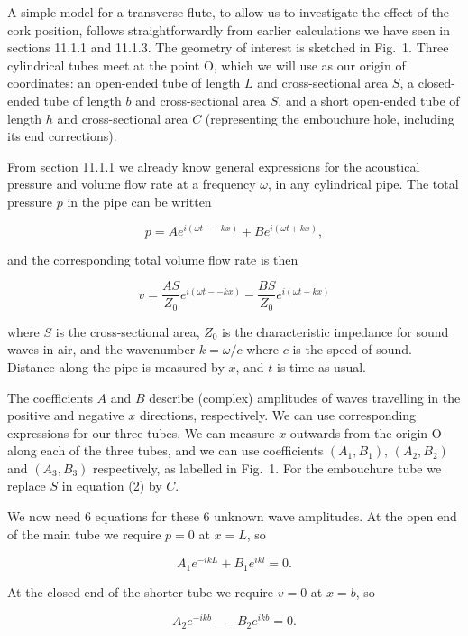   A simple model for a transverse flute, to allow us to investigate the effect 
  of the cork position, follows straightforwardly from earlier calculations we 
  have seen in sections 11.1.1 and 11.1.3. The geometry of interest is sketched 
  in Fig.\ 1. Three cylindrical tubes meet at the point O, which we will use as 
  our origin of coordinates: an open-ended tube of length $L$ and 
  cross-sectional area $S$, a closed-ended tube of length $b$ and 
  cross-sectional area $S$, and a short open-ended tube of length $h$ and 
  cross-sectional area $C$ (representing the embouchure hole, including its end 
  corrections). 


  From section 11.1.1 we already know general expressions for the acoustical 
  pressure and volume flow rate at a frequency $\omega$, in any cylindrical 
  pipe. The total pressure $p$ in the pipe can be written 

  $$p=Ae^{i(\omega t -- kx)}+Be^{i(\omega t + kx)} , \tag{1}$$ 

  and the corresponding total volume flow rate is then 

  $$v=\dfrac{AS}{Z_0}e^{i(\omega t -- kx)}-\dfrac{BS}{Z_0}e^{i(\omega t + kx)} 
  \tag{2}$$ 

  where $S$ is the cross-sectional area, $Z_0$ is the characteristic impedance 
  for sound waves in air, and the wavenumber $k=\omega/c$ where $c$ is the 
  speed of sound. Distance along the pipe is measured by $x$, and $t$ is time 
  as usual. 

  The coefficients $A$ and $B$ describe (complex) amplitudes of waves 
  travelling in the positive and negative $x$ directions, respectively. We can 
  use corresponding expressions for our three tubes. We can measure $x$ 
  outwards from the origin O along each of the three tubes, and we can use 
  coefficients $(A_1,B_1)$, $(A_2,B_2)$ and $(A_3,B_3)$ respectively, as 
  labelled in Fig.\ 1. For the embouchure tube we replace $S$ in equation (2) 
  by $C$. 

  We now need 6 equations for these 6 unknown wave amplitudes. At the open end 
  of the main tube we require $p=0$ at $x=L$, so 

  $$A_1 e^{-ikL} + B_1 e^{ikl} =0. \tag{3}$$ 

  At the closed end of the shorter tube we require $v=0$ at $x=b$, so 

  $$A_2 e^{-ikb} -- B_2 e^{ikb} =0. \tag{4}$$ 

